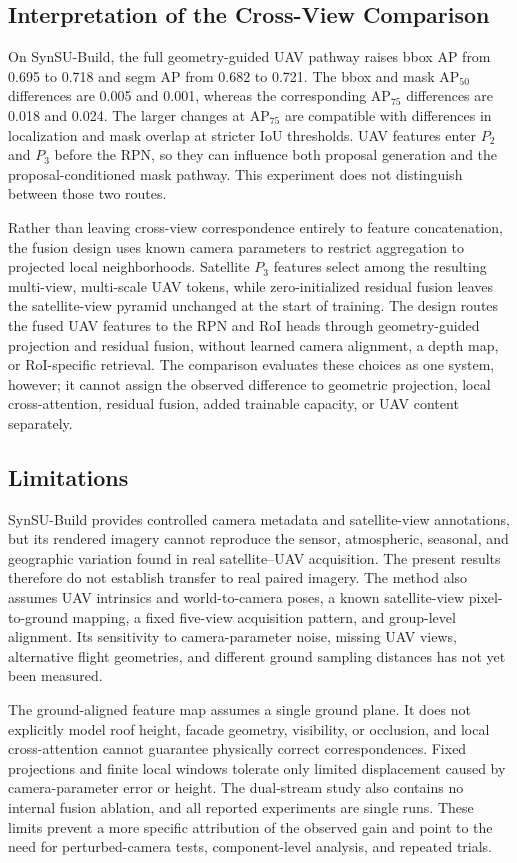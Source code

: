 \documentclass[letterpaper,journal]{IEEEtran}
\begin{document}
\subsection{Interpretation of the Cross-View Comparison}
On SynSU-Build, the full geometry-guided UAV pathway raises bbox AP from 0.695 to 0.718 and
segm AP from 0.682 to 0.721. The bbox and mask AP$_{50}$ differences are 0.005 and 0.001,
whereas the corresponding AP$_{75}$ differences are 0.018 and 0.024. The larger changes at
AP$_{75}$ are compatible with differences in localization and mask overlap at stricter IoU
thresholds. UAV features enter $P_2$ and $P_3$ before the RPN, so they can influence both
proposal generation and the proposal-conditioned mask pathway. This experiment does not
distinguish between those two routes.

Rather than leaving cross-view correspondence entirely to feature concatenation, the fusion
design uses known camera parameters to restrict aggregation to projected local neighborhoods.
Satellite $P_3$ features select among the resulting multi-view, multi-scale UAV tokens, while
zero-initialized residual fusion leaves the satellite-view pyramid unchanged at the start of
training. The design routes the fused UAV features to the RPN and RoI heads through
geometry-guided projection and residual fusion, without learned camera alignment, a depth map,
or RoI-specific retrieval. The comparison evaluates these choices as one system, however; it
cannot assign the observed difference to geometric projection, local cross-attention, residual
fusion, added trainable capacity, or UAV content separately.

\subsection{Limitations}
SynSU-Build provides controlled camera metadata and satellite-view annotations, but its rendered
imagery cannot reproduce the sensor, atmospheric, seasonal, and geographic variation found in
real satellite--UAV acquisition. The present results therefore do not establish transfer to
real paired imagery. The method also assumes UAV intrinsics and world-to-camera poses, a known
satellite-view pixel-to-ground mapping, a fixed five-view acquisition pattern, and group-level
alignment. Its sensitivity to camera-parameter noise, missing UAV views, alternative flight
geometries, and different ground sampling distances has not yet been measured.

The ground-aligned feature map assumes a single ground plane. It does not explicitly model roof
height, facade geometry, visibility, or occlusion, and local cross-attention cannot guarantee
physically correct correspondences. Fixed projections and finite local windows tolerate only
limited displacement caused by camera-parameter error or height. The dual-stream study also
contains no internal fusion ablation, and all reported experiments are single runs. These
limits prevent a more specific attribution of the observed gain and point to the need for
perturbed-camera tests, component-level analysis, and repeated trials.
\end{document}
